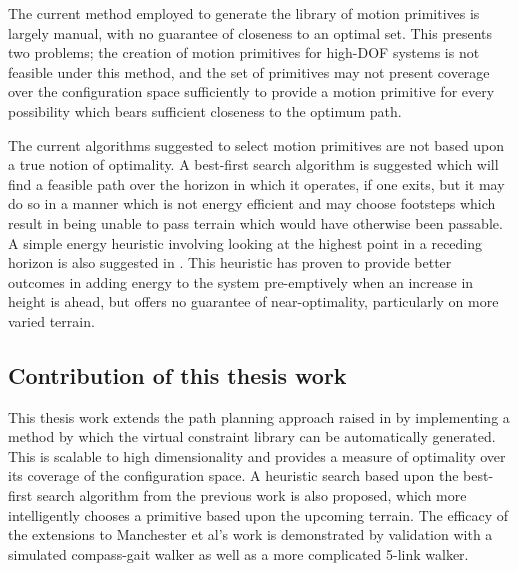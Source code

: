 The current method employed to generate the library of motion primitives is largely manual, with no guarantee of closeness to an optimal set. This presents two problems; the creation of motion primitives for high-DOF systems is not feasible under this method, and the set of primitives may not present coverage over the configuration space sufficiently to provide a motion primitive for every possibility which bears sufficient closeness to the optimum path. 

The current algorithms suggested to select motion primitives are not based upon a true notion of optimality. A best-first search algorithm is suggested which will find a feasible path over the horizon in which it operates, if one exits, but it may do so in a manner which is not energy efficient and may choose footsteps which result in being unable to pass terrain which would have otherwise been passable. A simple energy heuristic involving looking at the highest point in a receding horizon is also suggested in \cite{manchester13planning}. This heuristic has proven to provide better outcomes in adding energy to the system pre-emptively when an increase in height is ahead, but offers no guarantee of near-optimality, particularly on more varied terrain. 

\subsection{Contribution of this thesis work}
This thesis work extends the path planning approach raised in \cite{manchester13planning} by implementing a method by which the virtual constraint library can be automatically generated. This is scalable to high dimensionality and provides a measure of optimality over its coverage of the configuration space. A heuristic search based upon the best-first search algorithm from the previous work is also proposed, which more intelligently chooses a primitive based upon the upcoming terrain. The efficacy of the extensions to Manchester et al's work is demonstrated by validation with a simulated compass-gait walker as well as a more complicated 5-link walker.